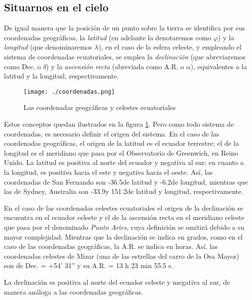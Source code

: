 \documentclass[11pt,a5paper,twoside]{amsbook}
\begin{document}
\subsection{Situarnos en el cielo}

De igual manera que la posición de un punto sobre la tierra se identifica por sus coordenadas geográficas, la \textit{latitud} (en adelante la denotaremos como $\varphi$) y la \textit{longitud} (que denominaremos $\lambda$), en el caso de la esfera celeste, y empleando el sistema de coordenadas ecuatoriales, se emplea la \textit{declinación} (que abreviaremos como Dec. o $\delta$) y la \textit{ascensión recta} (abreviada como A.R. o $\alpha$), equivalentes a la latitud y la longitud, respectivamente.

\begin{figure}[ht]
 \centering
 \texttt{[image: ./coordenadas.png]}
 \caption{Las coordenadas geográficas y celestes ecuatoriales}
 \label{coordenadas}
\end{figure}

Estos conceptos quedan ilustrados en la figura \ref{coordenadas}. Pero como todo sistema de coordenadas, es necesario definir el origen del sistema. En el caso de las coordenadas geográficas, el origen de la latitud es el ecuador terrestre; el de la longitud es el meridiano que pasa por el Observatorio de Greenwich, en Reino Unido. La latitud es positiva al norte del ecuador y negativa al sur; en cuanto a la longitud, es positiva hacia el este y negativa hacia el oeste. Así, las coordenadas de San Fernando son -36.5\textdegree de latitud y -6.2\textdegree de longitud, mientras que las de Sydney, Australia son -33.9\textdegree y 151.2\textdegree de latitud y longitud, respectivamente.

En el caso de las coordenadas celestes ecuatoriales el origen de la declinación se encuentra en el ecuador celeste y el de la ascensión recta en el meridiano celeste que pasa por el denominado \textit{Punto Aries}, cuya definición se omitirá debido a su mayor complejidad. Mientras que la declinación se indica en grados, como en el caso de las coordenadas geográficas, la A.R. se indica en horas. Así, las coordenadas celestes de Mizar (una de las estrellas del carro de la Osa Mayor) son de Dec. = +54' 31'' y su A.R. = 13 h 23 min 55.5 s. 

La declinación es positiva al norte del ecuador celeste y megativa al sur, de manera análoga a las coordenadas geográficas.
\end{document}
